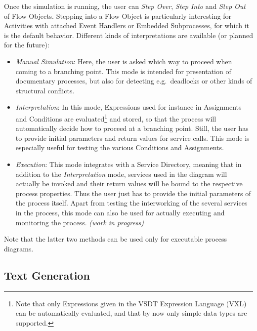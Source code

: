Once the simulation is running, the user can \emph{Step Over}, \emph{Step Into}
and \emph{Step Out} of Flow Objects.  Stepping into a Flow Object is particularly
interesting for Activities with attached Event Handlers or Embedded Subprocesses,
for which it is the default behavior.  Different kinds of interpretations are
available (or planned for the future):
\begin{itemize}
	\item \emph{Manual Simulation}: Here, the user is asked which way to proceed
	when coming to a branching point.  This mode is intended for presentation of
	documentary processes, but also for detecting e.g.\ deadlocks or other kinds
	of structural conflicts.

	\item \emph{Interpretation}: In this mode, Expressions used for instance in
	Assignments and Conditions are evaluated\footnote{Note that only Expressions
	given in the VSDT Expression Language (VXL) can be automatically evaluated,
	and that by now only simple data types are supported.} and stored, so that
	the process will automatically decide how to proceed at a branching point.
	Still, the user has to provide initial parameters and return values for
	service calls.  This mode is especially useful for testing the various
	Conditions and Assignments.

	\item \emph{Execution}: This mode integrates with a Service Directory, meaning
	that in addition to the \emph{Interpretation} mode, services used in the
	diagram will actually be invoked and their return values will be bound to the
	respective process properties.  Thus the user just has to provide the initial
	parameters of the process itself.  Apart from testing the interworking of the
	several services in the process, this mode can also be used for actually
	executing and monitoring the process. \emph{(work in progress)}
\end{itemize}

Note that the latter two methods can be used only for executable process diagrams.



\subsection{Text Generation}
\label{sec:user_features_text}

